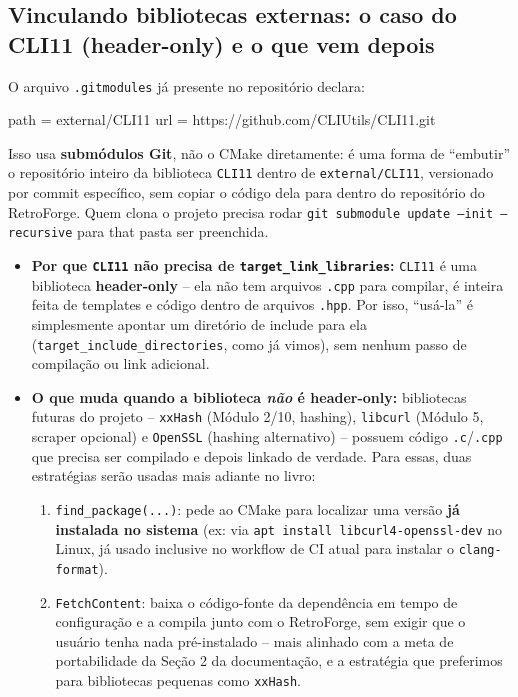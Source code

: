 \subsection{Vinculando bibliotecas externas: o caso do CLI11 (header-only) e o que vem depois}

O arquivo \texttt{.gitmodules} já presente no repositório declara:

\begin{CaixaCodigo}
	path = external/CLI11
	url = https://github.com/CLIUtils/CLI11.git
\end{CaixaCodigo}

Isso usa \textbf{submódulos Git}, não o CMake diretamente: é uma forma de ``embutir'' o repositório inteiro da biblioteca \texttt{CLI11} dentro de \texttt{external/CLI11}, versionado por commit específico, sem copiar o código dela para dentro do repositório do RetroForge. Quem clona o projeto precisa rodar \texttt{git submodule update --init --recursive} para that pasta ser preenchida.

\begin{itemize}
    \item \textbf{Por que \texttt{CLI11} não precisa de \texttt{target\_link\_libraries}:} \texttt{CLI11} é uma biblioteca \textbf{header-only} -- ela não tem arquivos \texttt{.cpp} para compilar, é inteira feita de templates e código dentro de arquivos \texttt{.hpp}. Por isso, ``usá-la'' é simplesmente apontar um diretório de include para ela (\texttt{target\_include\_directories}, como já vimos), sem nenhum passo de compilação ou link adicional.
    \item \textbf{O que muda quando a biblioteca \textit{não} é header-only:} bibliotecas futuras do projeto -- \texttt{xxHash} (Módulo 2/10, hashing), \texttt{libcurl} (Módulo 5, scraper opcional) e \texttt{OpenSSL} (hashing alternativo) -- possuem código \texttt{.c}/\texttt{.cpp} que precisa ser compilado e depois linkado de verdade. Para essas, duas estratégias serão usadas mais adiante no livro:
    \begin{enumerate}
        \item \texttt{find\_package(...)}: pede ao CMake para localizar uma versão \textbf{já instalada no sistema} (ex: via \texttt{apt install libcurl4-openssl-dev} no Linux, já usado inclusive no workflow de CI atual para instalar o \texttt{clang-format}).
        \item \texttt{FetchContent}: baixa o código-fonte da dependência em tempo de configuração e a compila junto com o RetroForge, sem exigir que o usuário tenha nada pré-instalado -- mais alinhado com a meta de portabilidade da Seção 2 da documentação, e a estratégia que preferimos para bibliotecas pequenas como \texttt{xxHash}.
    \end{enumerate}
\end{itemize}

